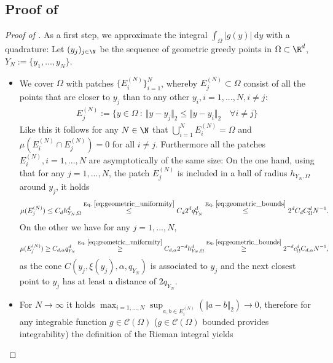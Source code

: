 \documentclass[a4paper, 10pt]{article}
\begin{document}
\subsection{Proof of }

\begin{proof}[Proof of ]
As a first step, we approximate the integral $\int_\Omega |g(y)| ~ \mathrm{d}y$ with a quadrature:
Let $(y_j)_{j \in \N}$ be the sequence of geometric greedy points in $\Omega \subset \R^d$, $Y_N := \{y_1, ..., y_N\}$. 
\begin{itemize}
\item We cover $\Omega$ with patches $\{ E_i^{(N)} \}_{i=1}^N$, whereby $E_j^{(N)} \subset \Omega$ consist of all the points that are closer to $y_j$ than to any other $y_i, i=1, ..., N, i \neq j$:
\begin{align*}
E_j^{(N)} := \{y \in \Omega ~:~ \Vert y - y_j \Vert_2 \leq \Vert y - y_i \Vert_2 \quad \forall i \neq j \}
\end{align*}
Like this it follows for any $N \in \N$ that $\bigcup_{i=1}^N E_i^{(N)} = \Omega$ and $\mu(E_i^{(N)} \cap E_j^{(N)}) = 0$ for all $i \neq j$.
Furthermore all the patches $E_i^{(N)}, i=1, ..., N$ are asymptotically of the same size:
On the one hand, using that for any $j=1, ..., N$, 
the patch $E_j^{(N)}$ is included in a ball of radius $h_{Y_N, \Omega}$ around $y_j$, it holds
\begin{align}
\label{eq:patch_size_upper_bound}
\mu(E_j^{(N)}) \leq C_d h_{Y_N, \Omega}^d \stackrel{\text{Eq.\ } \eqref{eq:geometric_uniformity}}{\leq} C_d 2^d q_{Y_N}^d \stackrel{\text{Eq.\ } \eqref{eq:geometric_bounds}}{\leq} 2^d C_d C_\Omega^d N^{-1}.
\end{align}
On the other we have for any $j=1, ..., N$, 
\begin{align}
\label{eq:patch_size_lower_bound}
\mu(E_j^{(N)}) \geq C_{d, \alpha} q_{Y_N}^d \stackrel{\text{Eq.\ } \eqref{eq:geometric_uniformity}}{\geq} 
C_{d, \alpha} 2^{-d} h_{Y_N, \Omega}^d 
\stackrel{\text{Eq.\ } \eqref{eq:geometric_bounds}}{\geq}  2^{-d} c_\Omega^{d} C_{d, \alpha} N^{-1},
\end{align}
as the cone $C(y_j, \xi(y_j), \alpha, q_{Y_N})$ is associated to $y_j$ and the next closest point to $y_j$ has at least a distance of $2q_{Y_N}$.
\item For $N \rightarrow \infty$ it holds $\max_{i=1, ..., N} \sup_{a, b \in \overline{E_i^{(N)}}}( \Vert a - b \Vert_2) \rightarrow 0$, 
therefore for any integrable function $g \in \mathcal{C}(\Omega)$ ($g \in \mathcal{C}(\Omega)$ bounded provides integrability) the definition of the Rieman integral yields

\end{itemize}
\end{proof}
\end{document}

